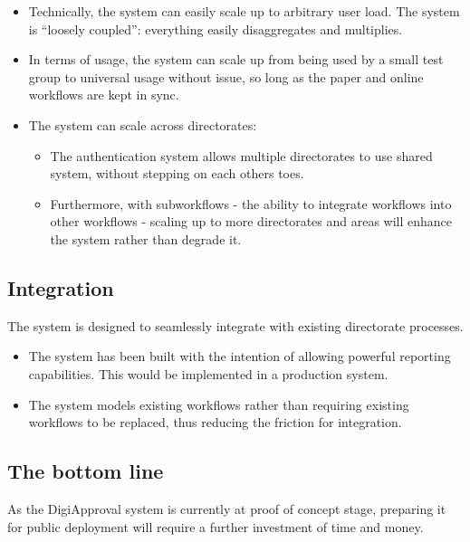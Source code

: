 \documentclass[12pt,a4paper,twosided]{article}
\begin{document}
\begin{itemize}

\item
  Technically, the system can easily scale up to arbitrary user load.
  The system is ``loosely coupled'': everything easily disaggregates and
  multiplies.
\item
  In terms of usage, the system can scale up from being used by a small
  test group to universal usage without issue, so long as the paper and
  online workflows are kept in sync.
\item
  The system can scale across directorates:

  \begin{itemize}
  
  \item
    The authentication system allows multiple directorates to use shared
    system, without stepping on each others toes.
  \item
    Furthermore, with subworkflows - the ability to integrate workflows
    into other workflows - scaling up to more directorates and areas
    will enhance the system rather than degrade it.
  \end{itemize}
\end{itemize}

\subsection{Integration}

The system is designed to seamlessly integrate with existing directorate
processes.

\begin{itemize}

\item
  The system has been built with the intention of allowing powerful
  reporting capabilities. This would be implemented in a production
  system.
\item
  The system models existing workflows rather than requiring existing
  workflows to be replaced, thus reducing the friction for integration.
\end{itemize}

\subsection{The bottom line}

As the DigiApproval system is currently at proof of concept stage,
preparing it for public deployment will require a further investment of
time and money.
\end{document}
